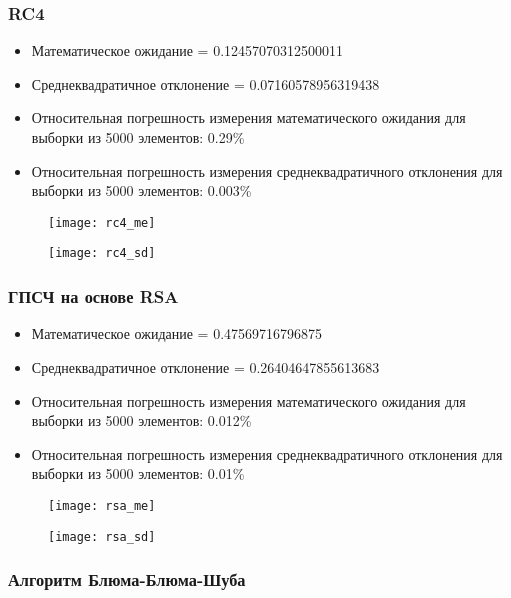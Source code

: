 \documentclass[spec, och, labwork]{SCWorks}
\begin{document}
\subsubsection{RC4}

\begin{itemize}
  \item Математическое ожидание = 0.12457070312500011
  \item Среднеквадратичное отклонение = 0.07160578956319438
  \item Относительная погрешность измерения математического ожидания для выборки из 5000 элементов: 0.29\%
  \item Относительная погрешность измерения среднеквадратичного отклонения для выборки из 5000 элементов: 0.003\%
\end{itemize}

\begin{figure}[H]
  \centering
  \texttt{[image: rc4\_me]}
\end{figure}
\begin{figure}[H]
  \centering
  \texttt{[image: rc4\_sd]}
\end{figure}

\subsubsection{ГПСЧ на основе RSA}

\begin{itemize}
  \item Математическое ожидание = 0.47569716796875
  \item Среднеквадратичное отклонение = 0.26404647855613683
  \item Относительная погрешность измерения математического ожидания для выборки из 5000 элементов: 0.012\%
  \item Относительная погрешность измерения среднеквадратичного отклонения для выборки из 5000 элементов: 0.01\%
\end{itemize}

\begin{figure}[H]
  \centering
  \texttt{[image: rsa\_me]}
\end{figure}
\begin{figure}[H]
  \centering
  \texttt{[image: rsa\_sd]}
\end{figure}

\subsubsection{Алгоритм Блюма-Блюма-Шуба}
\end{document}
